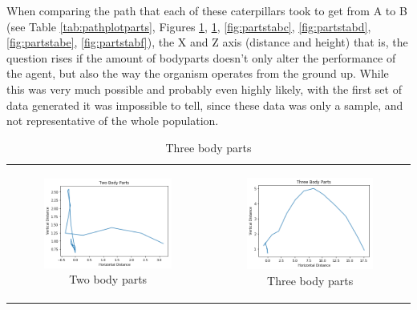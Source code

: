 \documentclass[12pt,oneside,listof=totoc,paper=a4,headings=small]{scrbook}
\begin{document}
\newpage

When comparing the path that each of these caterpillars took to get from A to B (see Table \ref{tab:pathplotparts}, Figures \ref{fig:partstaba}, \ref{fig:partstabb}, \ref{fig:partstabc}, \ref{fig:partstabd}, \ref{fig:partstabe}, \ref{fig:partstabf}), the X and Z axis (distance and height) that is, the question rises if the amount of bodyparts doesn't only alter the performance of the agent, but also the way the organism operates from the ground up. While this was very much possible and probably even highly likely, with the first set of data generated it was impossible to tell, since these data was only a sample, and not representative of the whole population.

{\centering
\begin{table}[ht]
\begin{tabular}{cc}
\begin{subfigure}{0.4\textwidth}\centering\includegraphics[width=0.75\columnwidth]{images/TwoBodyParts.png}\caption{Two body parts}\label{fig:partstaba}\end{subfigure}&
\begin{subfigure}{0.4\textwidth}\centering\includegraphics[width=0.75\columnwidth]{images/ThreeBodyParts.png}\caption{Three body parts}\label{fig:partstabb}\end{subfigure}\\

\end{tabular}
\end{table}}
\end{document}
